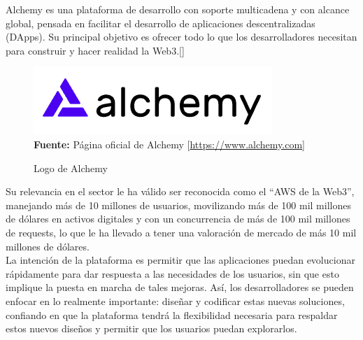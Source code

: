 Alchemy es una plataforma de desarrollo con soporte multicadena y con alcance
global, pensada en facilitar el desarrollo de aplicaciones descentralizadas
(DApps). Su principal objetivo es ofrecer todo lo que los desarrolladores
necesitan para construir y hacer realidad la Web3.[\cite{alchemy}]
\begin{figure}[htb!]
    \centering
    \caption{Logo de Alchemy}
    \label{fig:alchemy-logo}
    \centering
    \includegraphics[scale=0.5]{./Ilustraciones/logos/alchemy-logo.png}\\
    \textbf{Fuente:} Página oficial de Alchemy [\url{https://www.alchemy.com}]
\end{figure}
\hfill \break

Su relevancia en el sector le ha válido ser reconocida como el “AWS de la
Web3”, manejando más de 10 millones de usuarios, movilizando más de 100 mil
millones de dólares en activos digitales y con un concurrencia de más de 100
mil millones de requests, lo que le ha llevado a tener una valoración de
mercado de más 10 mil millones de dólares.\\

La intención de la plataforma es permitir que las aplicaciones puedan
evolucionar rápidamente para dar respuesta a las necesidades de los usuarios,
sin que esto implique la puesta en marcha de tales mejoras. Así, los
desarrolladores se pueden enfocar en lo realmente importante: diseñar y
codificar estas nuevas soluciones, confiando en que la plataforma tendrá la
flexibilidad necesaria para respaldar estos nuevos diseños y permitir que los
usuarios puedan explorarlos.